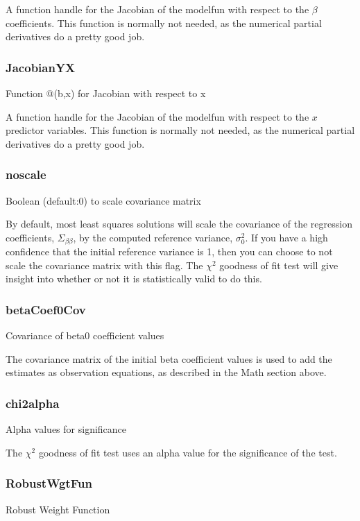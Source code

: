 \documentclass{article}
\begin{document}
	A function handle for the Jacobian of the modelfun with respect to the $\beta$ coefficients.  This function is normally not needed, as the numerical partial derivatives do a pretty good job.
	\subsubsection{JacobianYX}
	Function @(b,x) for Jacobian with respect to x
	
	A function handle for the Jacobian of the modelfun with respect to the $x$ predictor variables.  This function is normally not needed, as the numerical partial derivatives do a pretty good job.
	\subsubsection{noscale}
	Boolean (default:0) to scale covariance matrix
	
	By default, most least squares solutions will scale the covariance of the regression coefficients, $\Sigma_{\beta\beta}$, by the computed reference variance, $\sigma_0^2$.  If you have a high confidence that the initial reference variance is 1, then you can choose to not scale the covariance matrix with this flag.  The $\chi^2$ goodness of fit test will give insight into whether or not it is statistically valid to do this.
	
	\subsubsection{betaCoef0Cov}
	Covariance of beta0 coefficient values
	
	The covariance matrix of the initial beta coefficient values is used to add the estimates as observation equations, as described in the Math section above.
	\subsubsection{chi2alpha}
	Alpha values for significance
	
	The $\chi^2$ goodness of fit test uses an alpha value for the significance of the test.
	\clearpage
	\subsubsection{RobustWgtFun}
	Robust Weight Function
	
\end{document}

